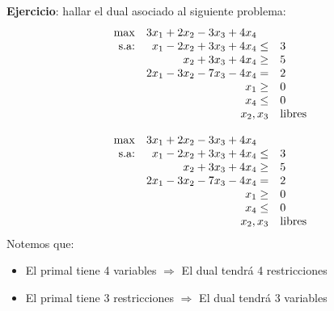 \documentclass[10pt, aspectratio=169,usenames,dvipsnames]{beamer}
\begin{document}
\begin{frame}{}
    \textbf{Ejercicio}: hallar el dual asociado al siguiente problema:
    \[
    \begin{array}{rrl}
        \max & \multicolumn{2}{l}{3x_1+2x_2-3x_3+4x_4}  \\
        \text{s.a:} & x_1-2x_2+3x_3+4x_4 \leq & 3 \\
         & x_2+3x_3+4x_4 \geq & 5 \\
         & 2x_1-3x_2-7x_3-4x_4 = & 2 \\
         & x_1 \geq & 0 \\
         & x_4 \leq & 0 \\
         & x_2, x_3 & \text{libres}
    \end{array}
    \]
    
\end{frame}

\begin{frame}{}
    \[
    \begin{array}{rrl}
        \max & \multicolumn{2}{l}{3x_1+2x_2-3x_3+4x_4}  \\
        \text{s.a:} & x_1-2x_2+3x_3+4x_4 \leq & 3 \\
         & x_2+3x_3+4x_4 \geq & 5 \\
         & 2x_1-3x_2-7x_3-4x_4 = & 2 \\
         & x_1 \geq & 0 \\
         & x_4 \leq & 0 \\
         & x_2, x_3 & \text{libres}
    \end{array}
    \]
    Notemos que:
    \begin{itemize}
        \item El primal tiene 4 variables $\Rightarrow$ El dual tendrá 4 restricciones
        \item El primal tiene 3 restricciones $\Rightarrow$ El dual tendrá 3 variables
    \end{itemize}
\end{frame}
\end{document}
